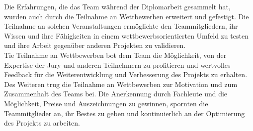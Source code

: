 Die Erfahrungen, die das Team während der Diplomarbeit gesammelt hat, wurden auch durch die Teilnahme an Wettbewerben erweitert und gefestigt. Die Teilnahme an solchen Veranstaltungen ermöglichte den Teammitgliedern, ihr Wissen und ihre Fähigkeiten in einem wettbewerbsorientierten Umfeld zu testen und ihre Arbeit gegenüber anderen Projekten zu validieren.
\\
Tie Teilnahme an Wettbewerben bot dem Team die Möglichkeit, von der Expertise der Jury und anderen Teilnehmern zu profitieren und wertvolles Feedback für die Weiterentwicklung und Verbesserung des Projekts zu erhalten.
\\
Des Weiteren trug die Teilnahme an Wettbewerben zur Motivation und zum Zusammenhalt des Teams bei. Die Anerkennung durch Fachleute und die Möglichkeit, Preise und Auszeichnungen zu gewinnen, spornten die Teammitglieder an, ihr Bestes zu geben und kontinuierlich an der Optimierung des Projekts zu arbeiten.
